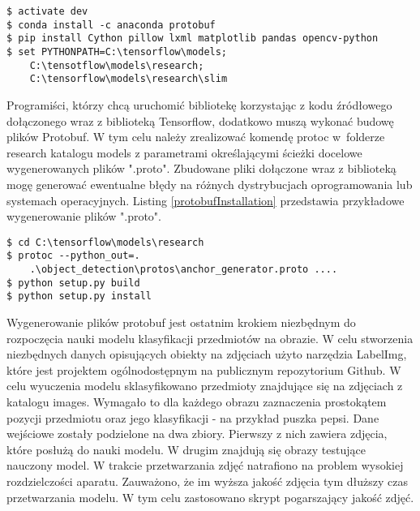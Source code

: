 \begin{lstlisting}[caption={Instalacja bibliotek.}, label={terminalConfiguration} ]
$ activate dev
$ conda install -c anaconda protobuf
$ pip install Cython pillow lxml matplotlib pandas opencv-python
$ set PYTHONPATH=C:\tensorflow\models;
	C:\tensotflow\models\research;
	C:\tensorflow\models\research\slim
\end{lstlisting}

Programiści, którzy chcą uruchomić bibliotekę korzystając z kodu źródłowego dołączonego wraz z biblioteką Tensorflow, dodatkowo muszą wykonać budowę plików Protobuf. W tym celu należy zrealizować komendę protoc w~folderze research katalogu models z parametrami określającymi ścieżki docelowe wygenerowanych plików ".proto". Zbudowane pliki dołączone wraz z biblioteką mogę generować ewentualne błędy na różnych dystrybucjach oprogramowania lub systemach operacyjnych. Listing \ref{protobufInstallation} przedstawia przykładowe wygenerowanie plików ".proto".

\begin{lstlisting}[caption={generowanie plików protobuf.}, label={protobufInstallation} ]
$ cd C:\tensorflow\models\research
$ protoc --python_out=. 
	.\object_detection\protos\anchor_generator.proto ....
$ python setup.py build
$ python setup.py install
\end{lstlisting}

Wygenerowanie plików protobuf jest ostatnim krokiem niezbędnym do rozpoczęcia nauki modelu klasyfikacji przedmiotów na obrazie. W celu stworzenia niezbędnych danych opisujących obiekty na zdjęciach użyto narzędzia LabelImg, które jest projektem ogólnodostępnym na publicznym repozytorium Github. W celu wyuczenia modelu sklasyfikowano przedmioty znajdujące się na zdjęciach z katalogu images. Wymagało to dla każdego obrazu zaznaczenia prostokątem pozycji przedmiotu oraz jego klasyfikacji - na przykład puszka pepsi. Dane wejściowe zostały podzielone na dwa zbiory. Pierwszy z nich zawiera zdjęcia, które posłużą do nauki modelu. W drugim znajdują się obrazy testujące nauczony model. W trakcie przetwarzania zdjęć natrafiono na problem wysokiej rozdzielczości aparatu. Zauważono, że im wyższa jakość zdjęcia tym dłuższy czas przetwarzania modelu. W tym celu zastosowano skrypt pogarszający jakość zdjęć. 

